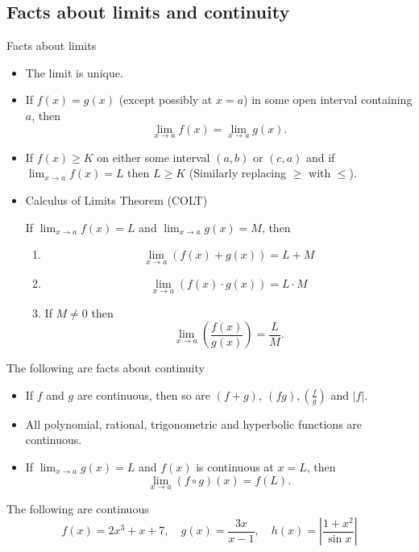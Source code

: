 \documentclass[10pt, a4paper]{article}
\begin{document}
\subsection{Facts about limits and continuity}
Facts about limits
\begin{itemize}
    \item The limit is unique.
    \item If $f(x) = g(x)$ (except possibly at $x = a$) in some open interval containing $a$, then
    \[
    \lim_{x \rightarrow a}f(x) = \lim_{x \rightarrow a}g(x).
    \]
    \item If $f(x) \geq K$ on either some interval $(a, b)$ or $(c, a)$ and if $\lim_{x \rightarrow a}f(x) = L$ then $L \geq K$ (Similarly replacing $\geq$ with $\leq$).
    \item Calculus of Limits Theorem (COLT)
    
    If $\lim_{x \rightarrow a}f(x) = L$ and $\lim_{x \rightarrow a}g(x) = M$, then
    \begin{enumerate}[label = \roman*)]
        \item \[
        \lim_{x \rightarrow a}(f(x) + g(x)) = L + M
        \]
        \item \[
        \lim_{x \rightarrow a}(f(x) \cdot g(x)) = L \cdot M
        \]
        \item If $M \neq 0$ then \[
            \lim_{x \rightarrow a}\left(\frac{f(x)}{g(x)}\right) = \frac{L}{M}.
        \]
    \end{enumerate}
\end{itemize}

The following are facts about continuity
\begin{itemize}
    \item If $f$ and $g$ are continuous, then so are $(f + g),\ (fg), \left(\frac{f}{g}\right)$ and $|f|$.
    \item All polynomial, rational, trigonometric and hyperbolic functions are continuous.
    \item If $\lim_{x \rightarrow a}g(x) = L$ and $f(x)$ is continuous at $x = L$, then
    \[
    \lim_{x \rightarrow a}(f \circ g)(x) = f(L).
    \]
\end{itemize}

\begin{example}
    The following are continuous
    \[
    f(x) = 2x ^ 3 + x + 7,\quad g(x) = \frac{3x}{x - 1},\quad h(x) = \left|\frac{1 + x ^ 2}{\sin x}\right|
    \]
\end{example}
\end{document}
